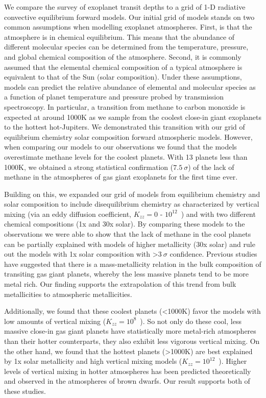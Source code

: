We compare the survey of exoplanet transit depths to a grid of 1-D radiative convective equilibrium forward models. Our initial grid of models stands on two common assumptions when modelling exoplanet atmospheres. First, is that the atmosphere is in chemical equilibrium. This means that the abundance of different molecular species can be determined from the temperature, pressure, and global chemical composition of the atmosphere. Second, it is commonly assumed that the elemental chemical composition of a typical atmosphere is equivalent to that of the Sun (solar composition). Under these assumptions, models can predict the relative abundance of elemental and molecular species as a function of planet temperature and pressure probed by transmission spectroscopy. In particular, a transition from methane to carbon monoxide is expected at around 1000K as we sample from the coolest close-in giant exoplanets to the hottest hot-Jupiters. We demonstrated this transition with our grid of equilibrium chemistry solar composition forward atmospheric models. However, when comparing our models to our observations we found that the models overestimate methane levels for the coolest planets. With 13 planets less than 1000K, we obtained a strong statistical confirmation ($7.5~\sigma$) of the lack of methane in the atmospheres of gas giant exoplanets for the first time ever.

Building on this, we expanded our grid of models from equilibrium chemistry and solar composition to include disequilibrium chemistry as characterized by vertical mixing (via an eddy diffusion coefficient, $K_{zz} = 0$ - $10^{12}$~\cmcms) and with two different chemical compositions (1x and 30x solar). By comparing these models to the observations we were able to show that the lack of methane in the cool planets can be partially explained with models of higher metallicity (30x solar) and rule out the models with 1x solar composition with >$3~\sigma$ confidence. Previous studies have suggested that there is a mass-metallicity relation in the bulk composition of transiting gas giant planets, whereby the less massive planets tend to be more metal rich. Our finding supports the extrapolation of this trend from bulk metallicities to atmospheric metallicities.

Additionally, we found that these coolest planets (<1000K) favor the models with low amounts of vertical mixing ($K_{zz} = 10^8$~\cmcms). So not only do these cool, less massive close-in gas giant planets have statistically more metal-rich atmospheres than their hotter counterparts, they also exhibit less vigorous vertical mixing. On the other hand, we found that the hottest planets (>1000K) are best explained by 1x solar metallicity and high vertical mixing models ($K_{zz}= 10^{12}$~\cmcms). Higher levels of vertical mixing in hotter atmospheres has been predicted theoretically and observed in the atmospheres of brown dwarfs. Our result supports both of these studies.

